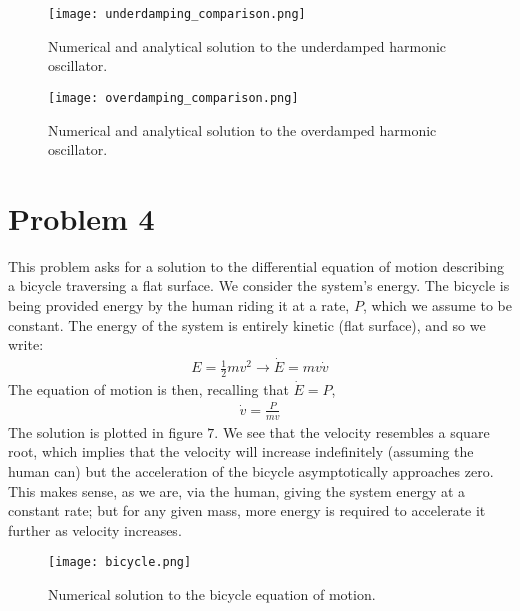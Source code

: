 \documentclass[letter,12pt]{article}
\begin{document}
\begin{figure}[htbp]
    \centering
    \texttt{[image: underdamping\_comparison.png]}
    \caption{Numerical and analytical solution to the underdamped harmonic oscillator.}
\end{figure}

\begin{figure}[htbp]
    \centering
    \texttt{[image: overdamping\_comparison.png]}
    \caption{Numerical and analytical solution to the overdamped harmonic oscillator.}
\end{figure}

\section{Problem 4}

This problem asks for a solution to the differential equation of motion describing a bicycle traversing a flat surface. We consider the system's energy. The bicycle is being provided energy by the human riding it at a rate, $P$, which we assume to be constant. The energy of the system is entirely kinetic (flat surface), and so we write:
\begin{align}
E = \frac{1}{2} m v^2 \to \dot{E} = mv\dot{v}
\end{align}
The equation of motion is then, recalling that $\dot{E} = P$,
\begin{align}
\dot{v} = \frac{P}{mv}
\end{align}
The solution is plotted in figure $7$. We see that the velocity resembles a square root, which implies that the velocity will increase indefinitely (assuming the human can) but the acceleration of the bicycle asymptotically approaches zero. This makes sense, as we are, via the human, giving the system energy at a constant rate; but for any given mass, more energy is required to accelerate it further as velocity increases. 

\begin{figure}[htbp]
    \centering
    \texttt{[image: bicycle.png]}
    \caption{Numerical solution to the bicycle equation of motion.}
\end{figure}
\end{document}
